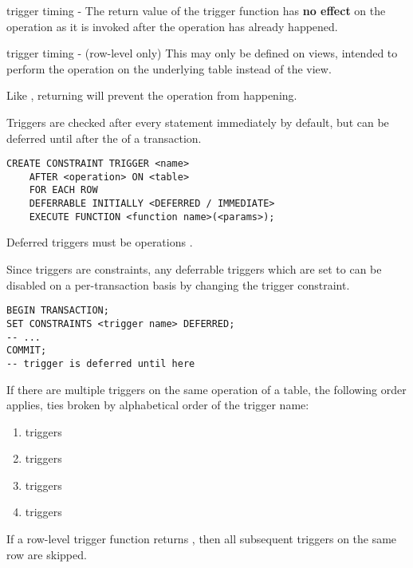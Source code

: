 \begin{defn}{trigger timing - }
    The return value of the trigger function has \textbf{no effect} on the operation
    as it is invoked after the operation has already happened.
\end{defn}

\begin{defn}{trigger timing -  (row-level only)}
    This may only be defined on views, intended to perform the operation on the underlying table instead of the view.

    Like , returning  will prevent the operation from happening.
\end{defn}

Triggers are checked after every statement immediately by default, but can be deferred until after the  of a transaction.

\begin{lstlisting}
CREATE CONSTRAINT TRIGGER <name>
    AFTER <operation> ON <table>
    FOR EACH ROW
    DEFERRABLE INITIALLY <DEFERRED / IMMEDIATE>
    EXECUTE FUNCTION <function name>(<params>);
\end{lstlisting}

Deferred triggers must be  operations .

Since triggers are constraints, any deferrable triggers which are set to  can be disabled on a per-transaction basis by changing the trigger constraint.

\begin{lstlisting}
BEGIN TRANSACTION;
SET CONSTRAINTS <trigger name> DEFERRED;
-- ...
COMMIT;
-- trigger is deferred until here
\end{lstlisting}

If there are multiple triggers on the same operation of a table, the following order applies, ties broken by alphabetical order of the trigger name:

\begin{enumerate}
    \item {} triggers
    \item {} triggers
    \item {} triggers
    \item {} triggers
\end{enumerate}

If a row-level  trigger function returns , then all subsequent triggers on the same row are skipped.